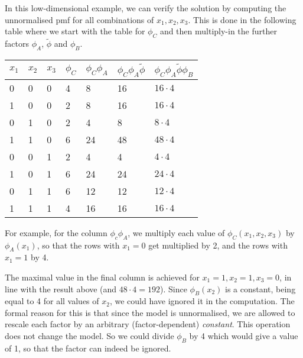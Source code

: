 \begin{exenumerate}
\begin{solution}
    In this low-dimensional example, we can verify the solution by
    computing the unnormalised pmf for all combinations of
    $x_1,x_2,x_3$. This is done in the following table where we start
    with the table for $\phi_C$ and then multiply-in the further
    factors $\phi_A$, $\tilde{\phi}$ and $\phi_B$. 
    \begin{center}
      \begin{tabular}{lllllll}
        \toprule
        $x_1$ & $x_2$ & $x_3$ & $\phi_C$ & $\phi_C \phi_A$ & $\phi_C \phi_A\tilde{\phi}$& $\phi_C \phi_A\tilde{\phi}\phi_B$ \\
        \midrule
        0 & 0 & 0 & 4 & 8 & 16 & $16\cdot 4$\\
        1 & 0 & 0 & 2 & 8 & 16 & $16 \cdot 4$\\
        0 & 1 & 0 & 2 & 4 & 8 & $8\cdot 4$\\
        1 & 1 & 0 & 6 & 24& 48 & $48 \cdot 4$\\
        0 & 0 & 1 & 2 & 4 & 4  & $4 \cdot 4$\\
        1 & 0 & 1 & 6 & 24 & 24 & $24 \cdot 4$\\
        0 & 1 & 1 & 6 & 12 & 12 & $12 \cdot 4$\\
        1 & 1 & 1 & 4 & 16 & 16 & $16\cdot 4$\\
        \bottomrule
      \end{tabular}
    \end{center}
    For example, for the column $\phi_c \phi_A$, we multiply each
    value of $\phi_C(x_1, x_2, x_3)$ by $\phi_A(x_1)$, so that the
    rows with $x_1=0$ get multiplied by 2, and the rows with $x_1=1$
    by 4.

    The maximal value in the final column is achieved for $x_1=1,
    x_2=1, x_3=0$, in line with the result above (and $48\cdot 4 =
    192$). Since $\phi_B(x_2)$ is a constant, being equal to 4 for all
    values of $x_2$, we could have ignored it in the computation. The
    formal reason for this is that since the model is unnormalised, we
    are allowed to rescale each factor by an arbitrary
    (factor-dependent) \emph{constant}. This operation does not change
    the model. So we could divide $\phi_B$ by 4 which would give a
    value of 1, so that the factor can indeed be ignored.
   

\end{solution}
\end{exenumerate}

